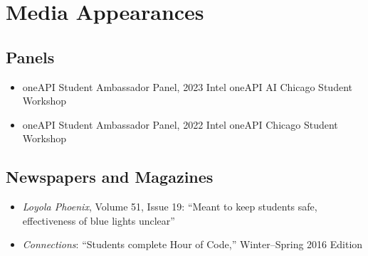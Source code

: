\section*{Media Appearances}

\subsection*{Panels}

\begin{itemize}

\item
oneAPI Student Ambassador Panel,
2023 Intel oneAPI AI Chicago Student Workshop

\item
oneAPI Student Ambassador Panel,
2022 Intel oneAPI Chicago Student Workshop

\end{itemize}

\subsection*{Newspapers and Magazines}

\begin{itemize}

\item
\textit{Loyola Phoenix}, Volume 51, Issue 19:
``Meant to keep students safe, effectiveness of blue lights unclear''

\item
\textit{Connections}:
``Students complete Hour of Code,''
Winter--Spring 2016 Edition

\end{itemize}